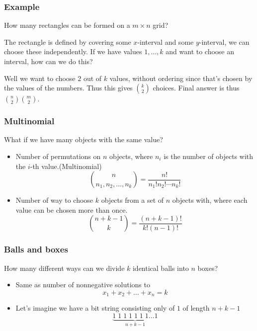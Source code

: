 \documentclass{beamer}
\begin{document}
\begin{frame}[plain]
    \frametitle{Example}
    \vspace{20pt}
    How many rectangles can be formed on a $m\times n$ grid?

     {
        The rectangle is defined by covering some $x$-interval and some $y$-interval, we can choose these
        independently. If we have values $1, \dots, k$ and want to choose an interval, how can we do this?
    }

     {
        Well we want to choose $2$ out of $k$ values, without ordering since that's chosen by the values of the
        numbers. Thus this gives $\binom{k}{2}$ choices. Final answer is thus $\binom{n}{2}\binom{m}{2}$.
    }
\end{frame}

\begin{frame}[plain]
  \vspace{20pt}
  \frametitle{Multinomial}
  What if we have many objects with the same value?
  \begin{itemize}
    \item Number of permutations on $n$ objects, where $n_i$ is the number of
      objects with the $i$-th value.(Multinomial)
      \[
        \binom{n}{n_1,n_2,\ldots,n_k} = \frac{n!}{n_1!n_2!\cdots n_k!}
      \]
    \item Number of way to choose $k$ objects from a set of $n$ objects with, where each value can be chosen more than once.
      \[
        \binom{n + k - 1}{k} = \frac{(n + k - 1)!}{k!(n-1)!}
      \]
  \end{itemize}
\end{frame}

\begin{frame}[plain]
  \frametitle{Balls and boxes}
  \vspace{30pt}
  How many different ways can we divide $k$ identical balls into $n$ boxes?
  \begin{itemize}
    \item Same as number of nonnegative solutions to
      \[
        x_1 + x_2 + \ldots + x_n = k
      \]
    \item Let's imagine we have a bit string consisting only of $1$ of length $n+k-1$
      \[
        \underbrace{1\;1\;1\;1\;1\;1\;1\ldots1}_{n+k-1}
      \]
  \end{itemize}
\end{frame}
\end{document}
